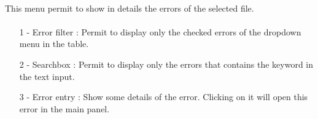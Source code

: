 \documentclass{article}
\begin{document}
\paragraph{}

\vspace{\baselineskip}

\paragraph{}
This menu permit to show in details the errors of the selected file.

\paragraph{}
\begin{itemize}
	\item[1 -] Error filter : Permit to display only the checked errors of the dropdown menu in the table.
    \item[2 -] Searchbox : Permit to display only the errors that contains the keyword in the text input.
    \item[3 -] Error entry : Show some details of the error. Clicking on it will open this error in the main panel.
\end{itemize}
    
\end{document}
